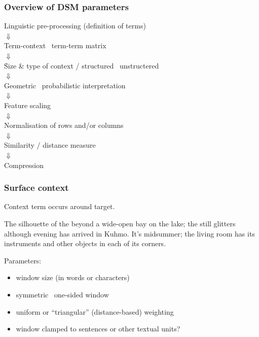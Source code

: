 \begin{frame}
  \frametitle{Overview of DSM parameters}

  \ungap[1]
  \begin{center}
    Linguistic pre-processing (definition of terms)\\
    $\Downarrow$\\
    Term-context \vs\ term-term matrix\\
    $\Downarrow$\\
    \h{Size \& type of context / structured \vs\ unstructered}\\
    $\Downarrow$\\
    Geometric \vs\ probabilistic interpretation\\
    $\Downarrow$\\
    Feature scaling\\
    $\Downarrow$\\
    Normalisation of rows and/or columns\\
    $\Downarrow$\\
    Similarity / distance measure\\
    $\Downarrow$\\
    Compression
  \end{center}
\end{frame}

\begin{frame}
  \frametitle{Surface context}
  
  \begin{center}
    Context term occurs  around target.
  \end{center}

  The {\color{secondary}silhouette of the} 
  {\color{secondary}beyond a wide-open} bay on {\color{secondary}the lake;
    the}  {\color{secondary}still glitters although} evening
  has arrived in Kuhmo. It's midsummer; the living room has its
  instruments and other objects in each of its corners.
  
  \gap
  Parameters:
  \begin{itemize}
  \item window size (in words or characters)
  \item symmetric \vs\ one-sided window
  \item uniform or ``triangular'' (distance-based) weighting
  \item window clamped to sentences or other textual units?
  \end{itemize}
\end{frame}


